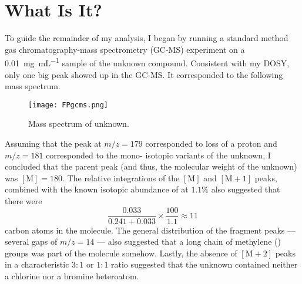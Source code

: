\documentclass[titlepage]{article}
\begin{document}
\section{What Is It?}\label{sse:WhatIsIt}
To guide the remainder of my analysis, I began by running a standard method gas chromatography-mass spectrometry (GC-MS) experiment on a \SI[per-mode=symbol]{0.01}{\milli\gram\per\milli\liter} sample of the unknown compound. Consistent with my DOSY, only one big peak showed up in the GC-MS. It corresponded to the following mass spectrum.
\begin{figure}[H]
    \centering
    \texttt{[image: FPgcms.png]}
    \caption{Mass spectrum of unknown.}
    \label{fig:FPgcms}
\end{figure}
Assuming that the peak at $m/z=179$ corresponded to loss of a proton and $m/z=181$ corresponded to the mono- isotopic variants of the unknown, I concluded that the parent peak (and thus, the molecular weight of the unknown) was $[\text{M}]=180$. The relative integrations of the $[\text{M}]$ and $[\text{M}+1]$ peaks, combined with the known isotopic abundance of  at $1.1\%$ also suggested that there were
\begin{equation*}
    \frac{0.033}{0.241+0.033}\times\frac{100}{1.1} \approx 11
\end{equation*}
carbon atoms in the molecule. The general distribution of the fragment peaks --- several gaps of $m/z=14$ --- also suggested that a long chain of methylene () groups was part of the molecule somehow. Lastly, the absence of $[\text{M}+2]$ peaks in a characteristic $3:1$ or $1:1$ ratio suggested that the unknown contained neither a chlorine nor a bromine heteroatom.\par
\end{document}
